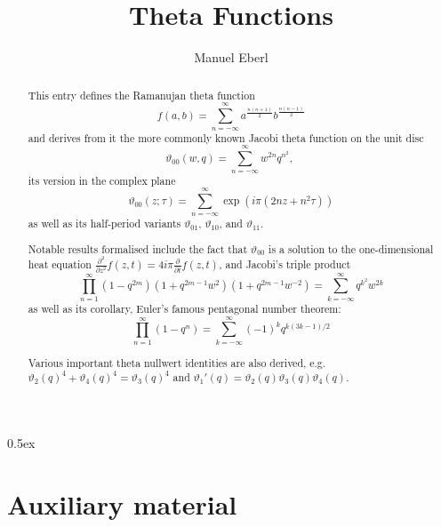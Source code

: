 \documentclass[11pt,a4paper]{article}
\begin{document}
\title{Theta Functions}
\author{Manuel Eberl}
\maketitle

\begin{abstract}
This entry defines the Ramanujan theta function
\[f(a,b) = \sum_{n=-\infty}^\infty a^{\frac{n(n+1)}{2}} b^{\frac{n(n-1)}{2}}\]
and derives from it the more commonly known Jacobi theta function on the unit disc
\[\vartheta_{00}(w,q) = \sum_{n=-\infty}^\infty w^{2n} q^{n^2},\ \]
its version in the complex plane
\[\vartheta_{00}(z;\tau) = \sum_{n=-\infty}^\infty \exp(i\pi (2nz + n^2\tau))\]
as well as its half-period variants $\vartheta_{01}$, $\vartheta_{10}$, and $\vartheta_{11}$.

Notable results formalised include the fact that $\vartheta_{00}$ is a solution to the 
one-dimensional heat equation $\frac{\partial^2}{\partial z^2} f(z,t) = 
    4i\pi \frac{\partial}{\partial t} f(z,t)$, and Jacobi's triple product
\[\prod_{n=1}^\infty (1-q^{2m})(1+q^{2m-1}w^2)(1+q^{2m-1}w^{-2}) = 
  \sum_{k=-\infty}^\infty q^{k^2}w^{2k}\]
as well as its corollary, Euler's famous pentagonal number theorem:
\[\prod_{n=1}^\infty (1-q^n) = \sum_{k=-\infty}^\infty (-1)^k q^{k(3k-1)/2}\]

Various important theta nullwert identities are also derived, e.g.\ 
$\vartheta_2(q)^4 + \vartheta_4(q)^4 = \vartheta_3(q)^4$ and $\vartheta_1'(q) = \vartheta_2(q) \vartheta_3(q)
\vartheta_4(q)$.
\end{abstract}

\newpage

\tableofcontents

\newpage
\parindent 0pt\parskip 0.5ex

\section{Auxiliary material}



\raggedright
\nocite{brent2020}
\nocite{borwein1987}



\end{document}
